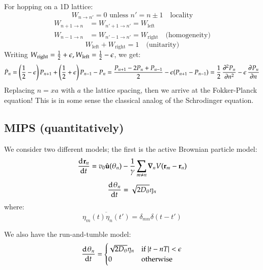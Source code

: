 For hopping on a 1D lattice:
\begin{equation}
    W_{n \to n'} = 0 \text{ unless } n' = n \pm 1 \quad \text{locality}
\end{equation}
\begin{equation}
    \begin{split}
        W_{n + 1 \to n} &= W_{n'+1 \to n'} = W_{\text{left}}
        \\ W_{n - 1 \to n} &= W_{n'-1 \to n'} = W_{\text{right}} \quad \text{(homogeneity)}
    \end{split}
\end{equation}
\begin{equation}
    W_{\text{left}} + W_{\text{right}} = 1 \quad \text{(unitarity)}
\end{equation}
Writing $W_{\text{right}} = \frac{1}{2} + \epsilon, W_{\text{left}} = \frac{1}{2}-\epsilon$, we get:
\begin{equation}
    \dot{P}_n = \left(\frac{1}{2} - \e\right)P_{n+1} + \left(\frac{1}{2} + \e\right)P_{n-1} - P_n = \frac{P_{n+1} - 2P_n + P_{n-1}}{2} - \e(P_{n+1} - P_{n-1}) = \frac{1}{2}\dpd[2]{P_n}{n} - \e\dpd{P_n}{n}
\end{equation}
Replacing $n = xa$ with $a$ the lattice spacing, then we arrive at the Fokker-Planck equation! This is in some sense the classical analog of the Schrodinger equation.

\subsection{MIPS (quantitatively)}
We consider two different models; the first is the active Brownian particle model:
\begin{equation}
    \dod{\v{r}_n}{t} = v_0\hat{\v{u}}(\theta_n) - \frac{1}{\gamma}\sum_{m\neq n}\nabla_n V(\v{r}_m - \v{r}_n)
\end{equation}
\begin{equation}
    \dod{\theta_n}{t} = \sqrt{2 D_\theta}\eta_n
\end{equation}
where:
\begin{equation}
    \overline{\eta_m(t)\eta_{n}(t')} = \delta_{mn}\delta(t-t')
\end{equation}

We also have the run-and-tumble model:
\begin{equation}
    \dod{\theta_n}{t} = \begin{cases}
        \sqrt{2D_\theta}\eta_n & \text{if } \abs{t - nT} < \e
        \\ 0 & \text{otherwise}
    \end{cases}
\end{equation}


